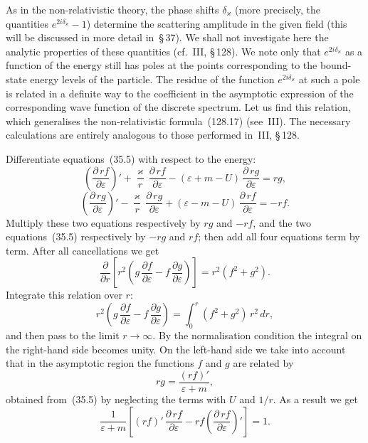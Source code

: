 As in the non-relativistic theory, the phase shifts $\delta_\varkappa$ (more precisely, the quantities $e^{2i\delta_\varkappa} - 1$) determine the scattering amplitude in the given field (this will be discussed in more detail in~\S\,37). We shall not investigate here the analytic properties of these quantities (cf.\ III, \S\,128). We note only that $e^{2i\delta_\varkappa}$ as a function of the energy still has poles at the points corresponding to the bound-state energy levels of the particle. The residue of the function $e^{2i\delta_\varkappa}$ at such a pole is related in a definite way to the coefficient in the asymptotic expression of the corresponding wave function of the discrete spectrum. Let us find this relation, which generalises the non-relativistic formula~(128.17) (see~III). The necessary calculations are entirely analogous to those performed in~III, \S\,128.

Differentiate equations~(35.5) with respect to the energy:
\[
\left(\frac{\partial\,rf}{\partial\varepsilon}\right)' + \frac{\varkappa}{r}\,\frac{\partial\,rf}{\partial\varepsilon} - (\varepsilon + m - U)\,\frac{\partial\,rg}{\partial\varepsilon} = rg,
\]
\[
\left(\frac{\partial\,rg}{\partial\varepsilon}\right)' - \frac{\varkappa}{r}\,\frac{\partial\,rg}{\partial\varepsilon} + (\varepsilon - m - U)\,\frac{\partial\,rf}{\partial\varepsilon} = -rf.
\]
Multiply these two equations respectively by $rg$ and $-rf$, and the two equations~(35.5) respectively by $-rg$ and $rf$; then add all four equations term by term. After all cancellations we get
\[
\frac{\partial}{\partial r}\!\left[r^2\!\left(g\,\frac{\partial f}{\partial\varepsilon} - f\,\frac{\partial g}{\partial\varepsilon}\right)\right] = r^2(f^2 + g^2).
\]
Integrate this relation over $r$:
\[
r^2\!\left(g\,\frac{\partial f}{\partial\varepsilon} - f\,\frac{\partial g}{\partial\varepsilon}\right) = \int_0^r (f^2 + g^2)\,r^2\,dr,
\]
and then pass to the limit $r\to\infty$. By the normalisation condition the integral on the right-hand side becomes unity. On the left-hand side we take into account that in the asymptotic region the functions $f$ and $g$ are related by
\[
rg = \frac{(rf)'}{\varepsilon + m},
\]
obtained from~(35.5) by neglecting the terms with $U$ and $1/r$. As a result we get
\begin{equation}
\frac{1}{\varepsilon + m}\!\left[(rf)'\,\frac{\partial\,rf}{\partial\varepsilon} - rf\!\left(\frac{\partial\,rf}{\partial\varepsilon}\right)'\right] = 1.
\tag{35.10}
\end{equation}

